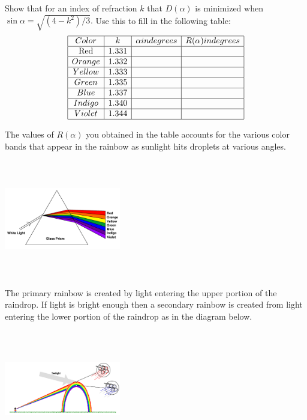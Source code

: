 \begin{myproblem}{}
  Show that for an index of refraction $k$ that $D(\alpha)$ is minimized when
  $\sin\alpha=\sqrt{(4-k^2)/3}.$  Use this to fill in the following table:
$$  
  \begin{array}[c]{|c|c|c|c|}
    \hline{}
    Color&k&\alpha in degrees&R(\alpha) in degrees\\\hline
     \text{Red}&1.331&&\\\hline
    Orange&1.332&&\\\hline
    Yellow&1.333&&\\\hline
    Green&1.335&&\\\hline
    Blue&1.337&&\\\hline
    Indigo&1.340&&\\\hline
    Violet&1.344&&\\\hline
  \end{array}
$$
\end{myproblem}

The values of $R(\alpha)$ you obtained in the table accounts for the
various color bands that appear in the rainbow as sunlight hits
droplets at various angles.

\includegraphics*[height=2in,width=2in]{Figures/Rainbow5}

The primary rainbow is created by light entering the upper portion of
the raindrop.  If light is bright enough then a secondary rainbow is
created from light entering the lower portion of the raindrop as in
the diagram below.

\includegraphics*[height=2in,width=2in]{Figures/Rainbow6}

